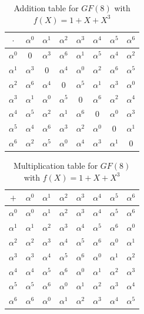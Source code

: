 \documentclass[fontsize=12pt]{article}
\begin{document}
\begin{table}[h]
\caption{Addition table for $GF(8)$ with $f(X)=1+X+X^3$}
\centering
\begin{tabular}{ |c||c|c|c|c|c|c|c| } 
 \hline
 
 $\cdot$ &$\alpha^0$ & $\alpha^1$ & $\alpha^2$ & $\alpha^3$ & $\alpha^4$ & $\alpha^5$ & $\alpha^6$\\
 \hline 
  \hline 
  $\alpha^0$ &$0$ & $\alpha^3$ & $\alpha^6$ & $\alpha^1$ & $\alpha^5$ & $\alpha^4$ & $\alpha^2$\\ 
  \hline 
  $\alpha^1$ &$\alpha^3$ & $0$ & $\alpha^4$ & $\alpha^0$ & $\alpha^2$ & $\alpha^6$ & $\alpha^5$ \\ 
  \hline 
  $\alpha^2$ &$\alpha^6$ & $\alpha^4$ & $0$ & $\alpha^5$ & $\alpha^1$ & $\alpha^3$ & $\alpha^0$\\ 
  \hline 
 $\alpha^3$ &$\alpha^1$ & $\alpha^0$ & $\alpha^5$ & $0$ & $\alpha^6$ & $\alpha^2$ & $\alpha^4$ \\ 
 \hline 
  $\alpha^4$ &$\alpha^5$ & $\alpha^2$ & $\alpha^1$ & $\alpha^6$ & $0$ & $\alpha^0$ & $\alpha^3$ \\ 
  \hline 
  $\alpha^5$ &$\alpha^4$ & $\alpha^6$ & $\alpha^3$ & $\alpha^2$ & $\alpha^0$ & $0$ & $\alpha^1$ \\ 
  \hline 
  $\alpha^6$ &$\alpha^2$ & $\alpha^5$ & $\alpha^0$ & $\alpha^4$ & $\alpha^3$ & $\alpha^1$ & $0$ \\ 
 \hline
\end{tabular}


\end{table}

\begin{table}[h]
\caption{Multiplication table for $GF(8)$ with $f(X)=1+X+X^3$}
\centering
\begin{tabular}{ |c||c|c|c|c|c|c|c| } 
 \hline
 
 $+$ &$\alpha^0$ & $\alpha^1$ & $\alpha^2$ & $\alpha^3$ & $\alpha^4$ & $\alpha^5$ & $\alpha^6$\\
 \hline 
  \hline 
  $\alpha^0$ &$\alpha^0$ & $\alpha^1$ & $\alpha^2$ & $\alpha^3$ & $\alpha^4$ & $\alpha^5$ & $\alpha^6$\\ 
  \hline 
  $\alpha^1$ &$\alpha^1$ & $\alpha^2$ & $\alpha^3$ & $\alpha^4$ & $\alpha^5$ & $\alpha^6$ & $\alpha^0$ \\ 
  \hline 
  $\alpha^2$ &$\alpha^2$ & $\alpha^3$ & $\alpha^4$ & $\alpha^5$ & $\alpha^6$ & $\alpha^0$ & $\alpha^1$\\ 
  \hline 
 $\alpha^3$ &$\alpha^3$ & $\alpha^4$ & $\alpha^5$ & $\alpha^6$ & $\alpha^0$ & $\alpha^1$ & $\alpha^2$ \\ 
 \hline 
  $\alpha^4$ &$\alpha^4$ & $\alpha^5$ & $\alpha^6$ & $\alpha^0$ & $\alpha^1$ & $\alpha^2$ & $\alpha^3$ \\ 
  \hline 
  $\alpha^5$ &$\alpha^5$ & $\alpha^6$ & $\alpha^0$ & $\alpha^1$ & $\alpha^2$ & $\alpha^3$ & $\alpha^4$ \\ 
  \hline 
  $\alpha^6$ &$\alpha^6$ & $\alpha^0$ & $\alpha^1$ & $\alpha^2$ & $\alpha^3$ & $\alpha^4$ & $\alpha^5$ \\ 
 \hline
\end{tabular}


\end{table}
\end{document}
